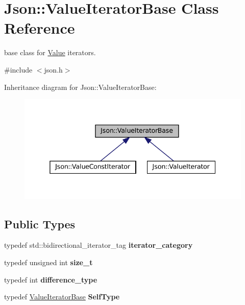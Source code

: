 \hypertarget{classJson_1_1ValueIteratorBase}{}\section{Json\+:\+:Value\+Iterator\+Base Class Reference}
\label{classJson_1_1ValueIteratorBase}


base class for \hyperlink{classJson_1_1Value}{Value} iterators.  




{\ttfamily \#include $<$json.\+h$>$}



Inheritance diagram for Json\+:\+:Value\+Iterator\+Base\+:
\nopagebreak
\begin{figure}[H]
\begin{center}
\leavevmode
\includegraphics[width=338pt]{classJson_1_1ValueIteratorBase__inherit__graph}
\end{center}
\end{figure}
\subsection*{Public Types}
\begin{DoxyCompactItemize}
\item 
\mbox{\label{classJson_1_1ValueIteratorBase_a02fd11a4fbdc0007da1e8bcf5e6b83c3}} 
typedef std\+::bidirectional\+\_\+iterator\+\_\+tag {\bfseries iterator\+\_\+category}
\item 
\mbox{\label{classJson_1_1ValueIteratorBase_a9d3a3c7ce5cdefe23cb486239cf07bb5}} 
typedef unsigned int {\bfseries size\+\_\+t}
\item 
\mbox{\label{classJson_1_1ValueIteratorBase_a4e44bf8cbd17ec8d6e2c185904a15ebd}} 
typedef int {\bfseries difference\+\_\+type}
\item 
\mbox{\label{classJson_1_1ValueIteratorBase_a9d2a940d03ea06d20d972f41a89149ee}} 
typedef \hyperlink{classJson_1_1ValueIteratorBase}{Value\+Iterator\+Base} {\bfseries Self\+Type}
\end{DoxyCompactItemize}
